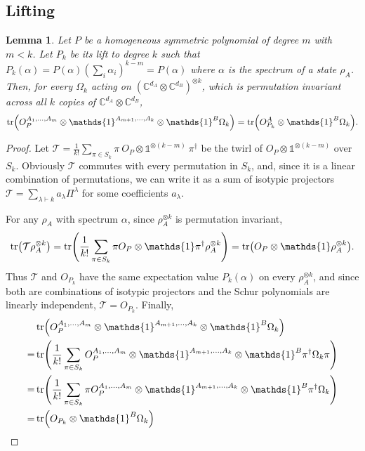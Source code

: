 \documentclass[aps,pra,twocolumn,superscriptaddress]{revtex4-2}
\newcommand{\one}{\mathds{1}}
\newcommand{\I}{\one}
\renewcommand{\a}{\alpha}
\newcommand{\C}{\mathds{C}}
\newtheorem{lemma}[theorem]{Lemma}
\begin{document}
\begin{widetext}
\section{Lifting}
\begin{lemma}\label{lem:lifting}
    Let $P$ be a homogeneous symmetric polynomial of degree $m$ with $m < k$. Let $P_k$ be its lift to degree $k$ such that $P_k(\a) = P(\a) \left(\sum_i \a_i \right)^{k-m} = P(\a)$ where $\a$ is the spectrum of a state $\rho_A$.
    Then, for every $\Omega_k$ acting on $(\C^{d_A} \otimes \C^{d_B})^{\otimes k}$, which is permutation invariant across all $k$ copies of $\C^{d_A} \otimes \C^{d_B}$,
    \begin{equation}
        \tr(O_P^{A_1,\dots, A_m} \otimes \I^{A_{m+1}, \dots, A_k} \otimes \I^{B} \Omega_k) = \tr(O_{P_k}^A \otimes \I^B \Omega_k).
    \end{equation}
\end{lemma}
\begin{proof}
    Let $\mathcal{T} = \frac{1}{k!}\sum_{\pi \in S_k} \pi \ O_P \otimes \I^{\otimes (k-m)} \ \pi^\dagger$ be the twirl of $O_P \otimes \I^{\otimes (k-m)}$ over $S_k$. Obviously $\mathcal{T}$ commutes with every permutation in $S_k$, and, since it is a linear combination of permutations, we can write it as a sum of isotypic projectors $\mathcal{T} = \sum_{\lambda \vdash k} a_\lambda \Pi^\lambda$ for some coefficients $a_\lambda$.

    For any $\rho_A$ with spectrum $\a$, since $\rho_A^{\otimes k}$ is permutation invariant,
    \begin{equation}
        \tr(\mathcal{T}\rho_A^{\otimes k}) = \tr(\frac{1}{k!} \sum_{\pi \in S_k} \pi O_P \otimes \I \pi^\dagger \rho_A^{\otimes k})= \tr(O_P \otimes \I \rho_A^{\otimes k}).
    \end{equation}
    Thus $\mathcal{T}$ and $O_{P_k}$ have the same expectation value $P_k(\a)$ on every $\rho_A^{\otimes k}$, and since both are combinations of isotypic projectors and the Schur polynomials are linearly independent, $\mathcal{T} = O_{P_k}$.
    Finally,
    \begin{align}
        &\tr(O_P^{A_1,\dots, A_m} \otimes \I^{A_{m+1}, \dots, A_k} \otimes \I^{B} \Omega_k)\\
        =& \tr( \frac{1}{k!}\sum_{\pi \in S_k} O_P^{A_1,\dots, A_m} \otimes \I^{A_{m+1}, \dots, A_k} \otimes \I^{B} \pi^\dagger \Omega_k \pi)\\
        =& \tr( \frac{1}{k!}\sum_{\pi \in S_k}  \pi O_P^{A_1,\dots, A_m} \otimes \I^{A_{m+1}, \dots, A_k} \otimes \I^{B} \pi^\dagger \Omega_k)\\
        =& \tr( O_{P_k} \otimes \I^{B} \Omega_k)
    \end{align}
\end{proof}


\end{widetext}
\end{document}
